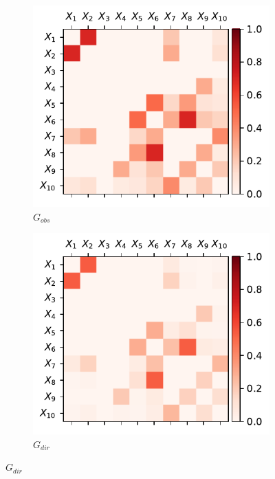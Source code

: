 \documentclass[../Thesis.tex]{subfiles}
\begin{document}
\begin{figure}[h]
    \centering
    \begin{subfigure}[t]{0.49\textwidth}
        \centering
        \includegraphics[width=.95\linewidth]{figures/Gaussian Network Theoretical/symmetric G obs - cor.pdf}
        \caption{$G_{obs}$}
    \end{subfigure}
    \hfill
    \begin{subfigure}[t]{0.49\textwidth}
        \centering
        \includegraphics[width=.95\linewidth]{figures/Gaussian Network Theoretical/G dir from symmetric G obs - cor.pdf}
        \caption{$G_{dir}$}

\end{subfigure}
\end{figure}
\end{document}
